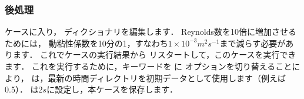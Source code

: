 \subsubsection{後処理}
\label{sssec:2.1.7.1}
ケースに入り，
%
%
ディクショナリを編集します．
Reynolds数を10倍に増加させるためには，
動粘性係数を10分の1，すなわち$1 \times 10^{-3} \unit{m^{2}s^{-1}}$まで減らす必要があります．
これでケースの実行結果から
%
リスタートして，このケースを実行できます．
これを実行するために，キーワードを
%
%
に
オプションを切り替えることにより，
は，最新の時間ディレクトリを初期データとして使用します（例えば0.5）．
は$2\unit{s}$に設定し，本ケースを保存します．

